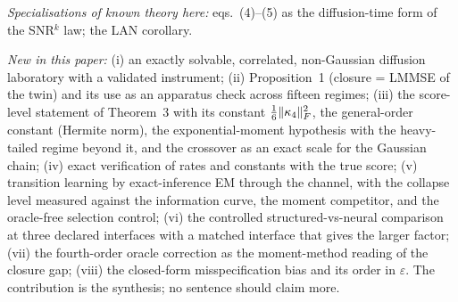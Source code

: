 \emph{Specialisations of known theory here:} eqs.~(4)--(5) as the diffusion-time form of the SNR$^k$ law; the LAN corollary.

\emph{New in this paper:} (i) an exactly solvable, correlated, non-Gaussian diffusion laboratory with a validated instrument; (ii) Proposition~1 (closure = LMMSE of the twin) and its use as an apparatus check across fifteen regimes; (iii) the score-level statement of Theorem~3 with its constant $\tfrac16\lVert \kappa_4 \rVert_{F}^2$, the general-order constant (Hermite norm), the exponential-moment hypothesis with the heavy-tailed regime beyond it, and the crossover as an exact scale for the Gaussian chain; (iv) exact verification of rates and constants with the true score; (v) transition learning by exact-inference EM through the channel, with the collapse level measured against the information curve, the moment competitor, and the oracle-free selection control; (vi) the controlled structured-vs-neural comparison at three declared interfaces with a matched interface that gives the larger factor; (vii) the fourth-order oracle correction as the moment-method reading of the closure gap; (viii) the closed-form misspecification bias and its order in $\varepsilon$. The contribution is the synthesis; no sentence should claim more.
